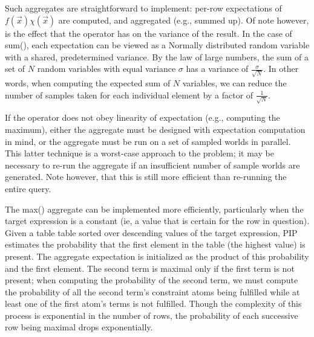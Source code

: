 Such aggregates are straightforward to implement: per-row expectations of $f(\vec x)\chi(\vec x)$ are computed, and aggregated (e.g., summed up).  Of note however, is the effect that the operator has on the variance of the result.  In the case of sum(), each expectation can be viewed as a Normally distributed random variable with a shared, predetermined variance.  By the law of large numbers, the sum of a set of $N$ random variables with equal variance $\sigma$ has a variance of $\frac{\sigma}{\sqrt{N}}$.  In other words, when computing the expected sum of $N$ variables, we can reduce the number of samples taken for each individual element by a factor of $\frac{1}{\sqrt{N}}$.

If the operator does not obey linearity of expectation (e.g., computing the maximum), either the aggregate must be designed with expectation computation in mind, or the aggregate must be run on a set of sampled worlds in parallel.  This latter technique is a worst-case approach to the problem; it may be necessary to re-run the aggregate if an insufficient number of sample worlds are generated. Note however, that this is still more efficient than re-running the entire query.

The max() aggregate can be implemented more efficiently, particularly when the target expression is a constant (ie, a value that is certain for the row in question).  Given a table table sorted over descending values of the target expression, PIP estimates the probability that the first element in the table (the highest value) is present.  The aggregate expectation is initialized as the product of this probability and the first element.  The second term is maximal only if the first term is not present; when computing the probability of the second term, we must compute the probability of all the second term's constraint atoms being fulfilled while at least one of the first atom's terms is not fulfilled.  Though the complexity of this process is exponential in the number of rows, the probability of each successive row being maximal drops exponentially.  




